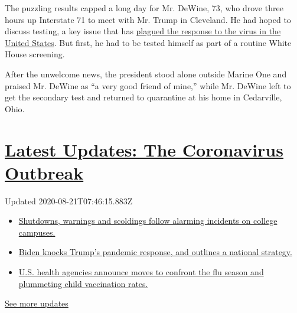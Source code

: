 The puzzling results capped a long day for Mr. DeWine, 73, who drove
three hours up Interstate 71 to meet with Mr. Trump in Cleveland. He had
hoped to discuss testing, a key issue that has
\href{https://www.nytimes3xbfgragh.onion/2020/08/04/us/virus-testing-delays.html}{plagued
the response to the virus in the United States}. But first, he had to be
tested himself as part of a routine White House screening.

After the unwelcome news, the president stood alone outside Marine One
and praised Mr. DeWine as ``a very good friend of mine,'' while Mr.
DeWine left to get the secondary test and returned to quarantine at his
home in Cedarville, Ohio.

\hypertarget{latest-updates-the-coronavirus-outbreak}{%
\section{\texorpdfstring{\href{https://www.nytimes3xbfgragh.onion/2020/08/20/world/coronavirus-covid.html?action=click\&pgtype=Article\&state=default\&region=MAIN_CONTENT_1\&context=storylines_live_updates}{Latest
Updates: The Coronavirus
Outbreak}}{Latest Updates: The Coronavirus Outbreak}}\label{latest-updates-the-coronavirus-outbreak}}

Updated 2020-08-21T07:46:15.883Z

\begin{itemize}
\tightlist
\item
  \href{https://www.nytimes3xbfgragh.onion/2020/08/20/world/coronavirus-covid.html?action=click\&pgtype=Article\&state=default\&region=MAIN_CONTENT_1\&context=storylines_live_updates\#link-68774d88}{Shutdowns,
  warnings and scoldings follow alarming incidents on college campuses.}
\item
  \href{https://www.nytimes3xbfgragh.onion/2020/08/20/world/coronavirus-covid.html?action=click\&pgtype=Article\&state=default\&region=MAIN_CONTENT_1\&context=storylines_live_updates\#link-26b58724}{Biden
  knocks Trump's pandemic response, and outlines a national strategy.}
\item
  \href{https://www.nytimes3xbfgragh.onion/2020/08/20/world/coronavirus-covid.html?action=click\&pgtype=Article\&state=default\&region=MAIN_CONTENT_1\&context=storylines_live_updates\#link-4e542da3}{U.S.
  health agencies announce moves to confront the flu season and
  plummeting child vaccination rates.}
\end{itemize}

\href{https://www.nytimes3xbfgragh.onion/2020/08/20/world/coronavirus-covid.html?action=click\&pgtype=Article\&state=default\&region=MAIN_CONTENT_1\&context=storylines_live_updates}{See
more updates}

